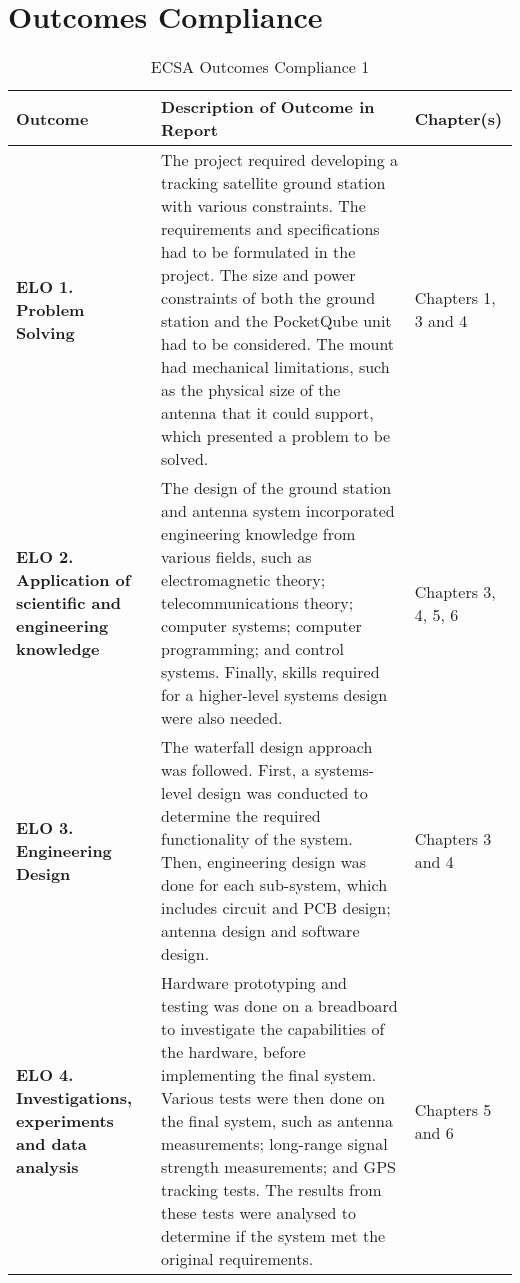\chapter{Outcomes Compliance}
\begin{table}[!htb]
  \centering
  \renewcommand{\arraystretch}{1.2}
  \begin{tabular}{ |p{4cm}|p{8cm}|p{3cm}| }
  \hline
  \textbf{Outcome}        & \textbf{Description of Outcome in Report}     & \textbf{Chapter(s)} \\
  \hline
  \textbf{ELO 1. Problem Solving} &
  The project required developing a tracking satellite ground station with various constraints. The requirements and specifications had to be formulated in the project. The size and power constraints of both the ground station and the PocketQube unit had to be considered. The mount had mechanical limitations, such as the physical size of the antenna that it could support, which presented a problem to be solved. &
  Chapters 1, 3 and 4 \\ \hline
  \textbf{ELO 2. Application of scientific and engineering knowledge} &
  The design of the ground station and antenna system incorporated engineering knowledge from various fields, such as electromagnetic theory; telecommunications theory; computer systems; computer programming; and control systems. Finally, skills required for a higher-level systems design were also needed. &
  Chapters 3, 4, 5, 6 \\ \hline
  \textbf{ELO 3. Engineering Design} &
  The waterfall design approach was followed. First, a systems-level design was conducted to determine the required functionality of the system. Then, engineering design was done for each sub-system, which includes circuit and PCB design; antenna design and software design.  &
  Chapters 3 and 4 \\ \hline
  \textbf{ELO 4. Investigations, experiments and data analysis} &
  Hardware prototyping and testing was done on a breadboard to investigate the capabilities of the hardware, before implementing the final system. Various tests were then done on the final system, such as antenna measurements; long-range signal strength measurements; and GPS tracking tests. The results from these tests were analysed to determine if the system met the original requirements. &
  Chapters 5 and 6 \\ \hline
  \end{tabular}
  \caption{ECSA Outcomes Compliance 1}
  \label{tab:outcomesCompliance1}
\end{table}

